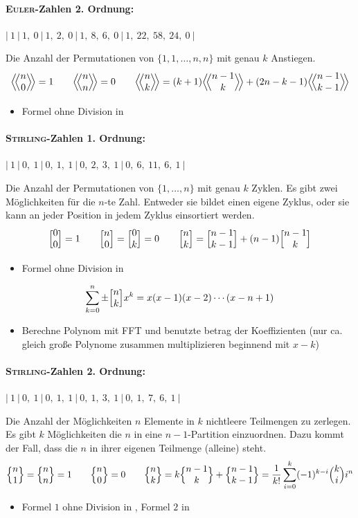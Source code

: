 \paragraph{\textsc{Euler}-Zahlen 2. Ordnung:}
$|~1~|~1,~0~|~1,~2,~0~|~1,~8,~6,~0~|~1,~22,~58,~24,~0~|$

Die Anzahl der Permutationen von $\{1,1, \ldots, n,n\}$ mit genau $k$ Anstiegen.
\[\eulerII{n}{0} = 1 \qquad\eulerII{n}{n} = 0 \qquad\eulerII{n}{k} = (k+1) \eulerII{n-1}{k} + (2n-k-1) \eulerII{n-1}{k-1}\]
\begin{itemize}
	\item Formel ohne Division in 
\end{itemize}

\paragraph{\textsc{Stirling}-Zahlen 1. Ordnung:}
$|~1~|~0,~1~|~0,~1,~1~|~0,~2,~3,~1~|~0,~6,~11,~6,~1~|$

Die Anzahl der Permutationen von $\{1, \ldots, n\}$ mit genau $k$ Zyklen.
Es gibt zwei Möglichkeiten für die $n$-te Zahl. Entweder sie bildet einen eigene Zyklus, oder sie kann an jeder Position in jedem Zyklus einsortiert werden.
\[\Bigl[ \begin{matrix} 0 \\ 0 \end{matrix} \Bigr] = 1 \qquad
\Bigl[ \begin{matrix} n \\ 0 \end{matrix} \Bigr] = \Bigl[ \begin{matrix} 0 \\ k \end{matrix} \Bigr] = 0 \qquad
\Bigl[ \begin{matrix} n \\ k \end{matrix} \Bigr] = \Bigl[ \begin{matrix} n-1 \\ k-1 \end{matrix} \Bigr] + (n-1) \Bigl[ \begin{matrix} n-1 \\ k \end{matrix} \Bigr]\]
\begin{itemize}
	\item Formel ohne Division in 
\end{itemize}
\[\sum_{k=0}^{n}\pm\Bigl[ \begin{matrix} n \\ k \end{matrix} \Bigr]x^k=x(x-1)(x-2)\cdots(x-n+1)\]
\begin{itemize}
	\item Berechne Polynom mit FFT und benutzte betrag der Koeffizienten  (nur ca. gleich große Polynome zusammen multiplizieren beginnend mit $x-k$)
\end{itemize}

\paragraph{\textsc{Stirling}-Zahlen 2. Ordnung:}
$|~1~|~0,~1~|~0,~1,~1~|~0,~1,~3,~1~|~0,~1,~7,~6,~1~|$

Die Anzahl der Möglichkeiten $n$ Elemente in $k$ nichtleere Teilmengen zu zerlegen.
Es gibt $k$ Möglichkeiten die $n$ in eine $n-1$-Partition einzuordnen.
Dazu kommt der Fall, dass die $n$ in ihrer eigenen Teilmenge (alleine) steht.
\[\Bigl\{ \begin{matrix} n \\ 1 \end{matrix} \Bigr\} = \Bigl\{ \begin{matrix} n \\ n \end{matrix} \Bigr\} = 1 \qquad
\Bigl\{ \begin{matrix} n \\ 0 \end{matrix} \Bigr\} = 0 \qquad
\Bigl\{ \begin{matrix} n \\ k \end{matrix} \Bigr\} = k \Bigl\{ \begin{matrix} n-1 \\ k \end{matrix} \Bigr\} + \Bigl\{ \begin{matrix} n-1 \\ k-1 \end{matrix} \Bigr\} =
\frac{1}{k!} \sum\limits_{i=0}^{k} (-1)^{k-i}\Bigl( \begin{matrix} k \\ i \end{matrix} \Bigr)i^n\]
\begin{itemize}
	\item Formel $1$ ohne Division in , Formel $2$ in 
\end{itemize}

